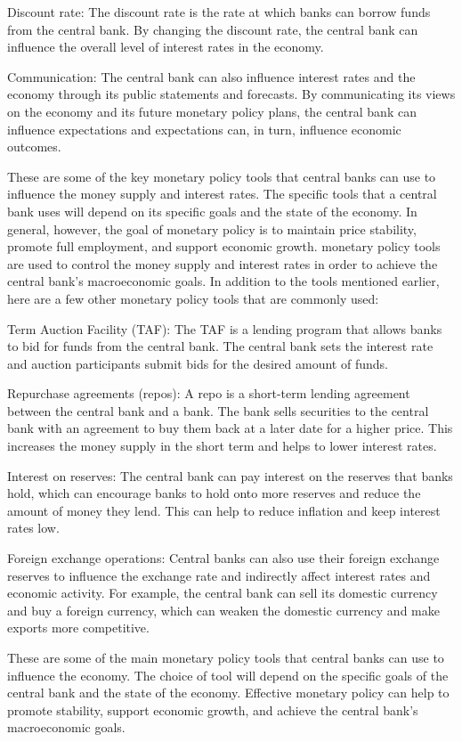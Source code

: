 \documentclass[12pt, a4paper, oneside]{article}
\begin{document}
Discount rate: The discount rate is the rate at which banks can borrow funds from the central bank. By changing the discount rate, the central bank can influence the overall level of interest rates in the economy.

Communication: The central bank can also influence interest rates and the economy through its public statements and forecasts. By communicating its views on the economy and its future monetary policy plans, the central bank can influence expectations and expectations can, in turn, influence economic outcomes.

These are some of the key monetary policy tools that central banks can use to influence the money supply and interest rates. The specific tools that a central bank uses will depend on its specific goals and the state of the economy. In general, however, the goal of monetary policy is to maintain price stability, promote full employment, and support economic growth.
monetary policy tools are used to control the money supply and interest rates in order to achieve the central bank's macroeconomic goals. In addition to the tools mentioned earlier, here are a few other monetary policy tools that are commonly used:

Term Auction Facility (TAF): The TAF is a lending program that allows banks to bid for funds from the central bank. The central bank sets the interest rate and auction participants submit bids for the desired amount of funds.

Repurchase agreements (repos): A repo is a short-term lending agreement between the central bank and a bank. The bank sells securities to the central bank with an agreement to buy them back at a later date for a higher price. This increases the money supply in the short term and helps to lower interest rates.

Interest on reserves: The central bank can pay interest on the reserves that banks hold, which can encourage banks to hold onto more reserves and reduce the amount of money they lend. This can help to reduce inflation and keep interest rates low.

Foreign exchange operations: Central banks can also use their foreign exchange reserves to influence the exchange rate and indirectly affect interest rates and economic activity. For example, the central bank can sell its domestic currency and buy a foreign currency, which can weaken the domestic currency and make exports more competitive.

These are some of the main monetary policy tools that central banks can use to influence the economy. The choice of tool will depend on the specific goals of the central bank and the state of the economy. Effective monetary policy can help to promote stability, support economic growth, and achieve the central bank's macroeconomic goals.
\end{document}
